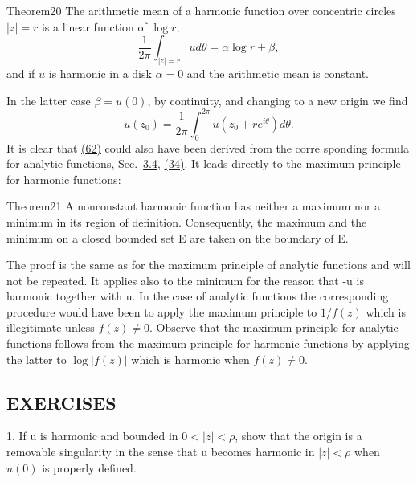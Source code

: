 \begin{originalstatement}{Theorem}{20}\label{thm:4.20}
The arithmetic mean of a harmonic function over concentric circles $|z| = r$ is a linear function of $\log r$,
\begin{equation*}
\frac {1}{2 \pi} \int_ {| z | = r} u d \theta = \alpha \log r + \beta ,\tag{61}\label{eq:4.61}
\end{equation*}
and if $u$ is harmonic in a disk $\alpha = 0$ and the arithmetic mean is constant.

\end{originalstatement}
In the latter case $\beta = u(0)$, by continuity, and changing to a new origin we find
\begin{equation*}
u (z _ {0}) = \frac {1}{2 \pi} \int_ {0} ^ {2 \pi} u (z _ {0} + r e ^ {i \theta}) d \theta .\tag{62}\label{eq:4.62}
\end{equation*}
It is clear that \hyperref[eq:4.62]{(62)} could also have been derived from the corre%
%
sponding formula for analytic functions, Sec.~\hyperref[sec:4.3.4]{3.4}, \hyperref[eq:4.34]{(34)}. It leads directly to the maximum principle for harmonic functions:

\begin{originalstatement}{Theorem}{21}\label{thm:4.21}
A nonconstant harmonic function has neither a maximum nor a minimum in its region of definition. Consequently, the maximum and the minimum on a closed bounded set E are taken on the boundary of E.
\end{originalstatement}
The proof is the same as for the maximum principle of analytic functions and will not be repeated. It applies also to the minimum for the reason that -u is harmonic together with u. In the case of analytic functions the corresponding procedure would have been to apply the maximum principle to $1/f(z)$ which is illegitimate unless $f(z) \neq 0$. Observe that the maximum principle for analytic functions follows from the maximum principle for harmonic functions by applying the latter to $\log |f(z)|$ which is harmonic when $f(z) \neq 0$.

\subsection*{EXERCISES}
1. If u is harmonic and bounded in $0 < |z| < \rho$, show that the origin is a removable singularity in the sense that u becomes harmonic in $|z| < \rho$ when $u(0)$ is properly defined.

